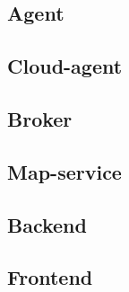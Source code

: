 \subsection{Agent}
\subsection{Cloud-agent}
\subsection{Broker}
\subsection{Map-service}
\subsection{Backend}
\subsection{Frontend}
